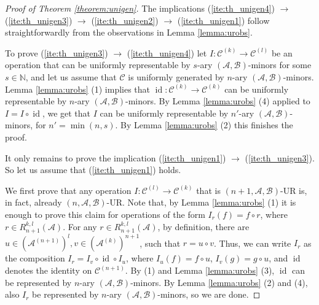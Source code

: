 \documentclass[11pt]{amsart}
\theoremstyle{plain}
\theoremstyle{definition}
\newcommand{\N}{{\mathbb N}}
\DeclareMathOperator{\id}{id}
\newcommand{\clone}[1]{\mathcal{#1}}
\newcommand{\clonoid}[1]{\mathcal{#1}}
\newcommand{\clodC}{\clonoid{C}}
\newcommand{\cloA}{\clone{A}}
\newcommand{\cloB}{\clone{B}}
\newcommand{\cloC}{\clone{C}}
\begin{document}
\begin{proof}[Proof of Theorem \ref{theorem:unigen}]
The implications (\ref{ite:th_unigen4}) $\to$ (\ref{ite:th_unigen3}) $\to$ (\ref{ite:th_unigen2}) $\to$ (\ref{ite:th_unigen1}) follow straightforwardly from the observations in Lemma \ref{lemma:urobs}. 

To prove (\ref{ite:th_unigen3}) $\to$ (\ref{ite:th_unigen4}) let $I \colon \clodC^{(k)} \to \clodC^{(l)}$ be an operation that can be uniformly representable by $s$-ary $(\cloA,\cloB)$-minors for some $s  \in \N$, and let us assume that $\clodC$ is uniformly generated by $n$-ary $(\cloA,\cloB)$-minors. Lemma \ref{lemma:urobs} (1) implies that $\id \colon \clodC^{(k)} \to \clodC^{(k)}$ can be uniformly representable by $n$-ary $(\cloA,\cloB)$-minors. By Lemma \ref{lemma:urobs} (4) applied to $I = I \circ \id$, we get that $I$ can be uniformly representable by $n'$-ary $(\cloA,\cloB)$-minors, for $n' = \min(n,s)$. By Lemma \ref{lemma:urobs} (2) this finishes the proof. 

It only remains to prove the implication (\ref{ite:th_unigen1}) $\to$ (\ref{ite:th_unigen3}). So let us assume that (\ref{ite:th_unigen1}) holds. 

We first prove that any operation $I\colon \clodC^{(l)} \to \clodC^{(k)}$ that is $(n+1,\cloA,\cloB)$-UR is, in fact, already $(n,\cloA,\cloB)$-UR. Note that, by Lemma \ref{lemma:urobs} (1) it is enough to prove this claim for operations of the form $I_r(f) = f \circ r$, where $r\in R_{n+1}^{k,l}(\cloA)$. For any $r\in R_{n+1}^{k,l}(\cloA)$, by definition, there are $u \in (\cloA^{(n+1)})^{l}, v \in (\cloA^{(k)})^{n+1}$, such that $r = u \circ v$. Thus, we can write $I_r$ as the composition $I_r = I_v \circ \id \circ I_u$, where $I_u(f) = f \circ u$, $I_v(g) = g \circ u$, and $\id$ denotes the identity on $\cloC^{(n+1)}$. By (1) and Lemma \ref{lemma:urobs} (3), $\id$ can be represented by $n$-ary $(\cloA,\cloB)$-minors. By Lemma \ref{lemma:urobs} (2) and (4), also $I_r$ be represented by $n$-ary $(\cloA,\cloB)$-minors, so we are done.


\end{proof}
\end{document}
